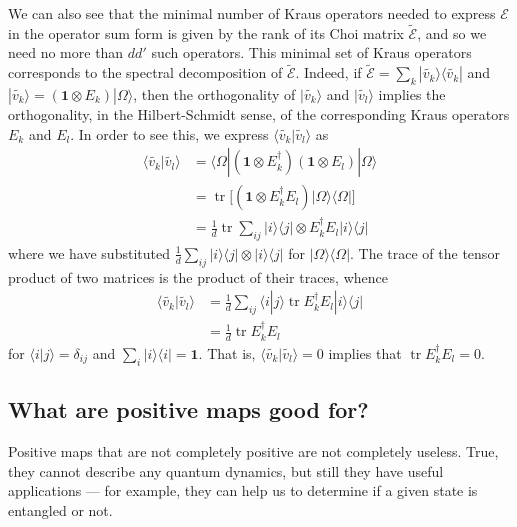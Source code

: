 \documentclass[fleqn]{article}
\begin{document}
We can also see that the minimal number of Kraus operators needed to express \(\mathcal{E}\) in the operator sum form is given by the rank of its Choi matrix \(\widetilde{\mathcal{E}}\), and so we need no more than \(dd'\) such operators.
This minimal set of Kraus operators corresponds to the spectral decomposition of \(\widetilde{\mathcal{E}}\).
Indeed, if \(\widetilde{\mathcal{E}}=\sum_k |\widetilde{v_k}\rangle\langle\widetilde{v_k}|\) and \(|\widetilde{v_k}\rangle = (\mathbf{1}\otimes E_k)|\Omega\rangle\), then the orthogonality of \(|\widetilde{v_k}\rangle\) and \(|\widetilde{v_l}\rangle\) implies the orthogonality, in the Hilbert-Schmidt sense, of the corresponding Kraus operators \(E_k\) and \(E_l\).
In order to see this, we express \(\langle\widetilde{v_k}|\widetilde{v_l}\rangle\) as
\[
  \begin{aligned}
    \langle\widetilde{v_k} |\widetilde{v_l}\rangle
    &= \langle\Omega| ( \mathbf{1}\otimes E_k^\dagger)(\mathbf{1}\otimes E_l)|\Omega\rangle
  \\&= \operatorname{tr}\big[(\mathbf{1}\otimes E_k^\dagger E_l)|\Omega\rangle\langle\Omega|\big]
  \\&= \frac{1}{d} \operatorname{tr}\sum_{ij} |i\rangle\langle j|\otimes E_k^\dagger E_l |i\rangle\langle j|
  \end{aligned}
\]
where we have substituted \(\frac{1}{d}\sum_{ij}|i\rangle\langle j|\otimes|i\rangle\langle j|\) for \(|\Omega\rangle\langle\Omega|\).
The trace of the tensor product of two matrices is the product of their traces, whence
\[
  \begin{aligned}
    \langle\widetilde{v_k} |\widetilde{v_l}\rangle
    &= \frac{1}{d}\sum_{ij} \langle i |j\rangle \operatorname{tr}E_k^\dagger E_l |i\rangle\langle j|
  \\&= \frac{1}{d} \operatorname{tr}E_k^\dagger E_l
  \end{aligned}
\]
for \(\langle i|j\rangle=\delta_{ij}\) and \(\sum_i|i\rangle\langle i|=\mathbf{1}\).
That is, \(\langle\widetilde{v_k}|\widetilde{v_l}\rangle=0\) implies that \(\operatorname{tr}E_k^\dagger E_l=0\).

\hypertarget{what-are-positive-maps-good-for}{%
\subsection{What are positive maps good for?}\label{what-are-positive-maps-good-for}}

Positive maps that are not completely positive are not completely useless.
True, they cannot describe any quantum dynamics, but still they have useful applications --- for example, they can help us to determine if a given state is entangled or not.
\end{document}

